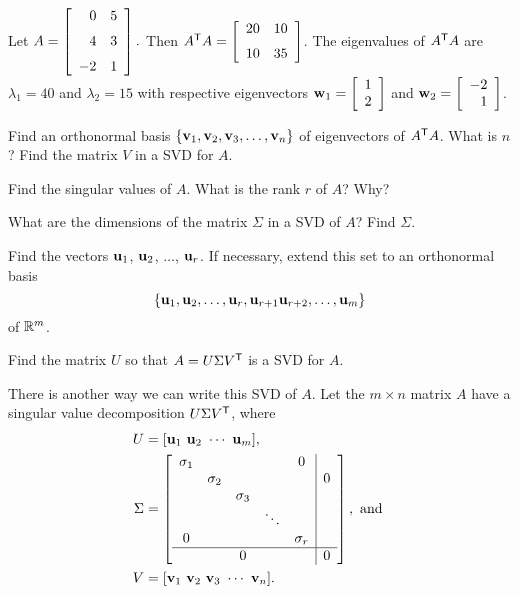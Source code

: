 \begin{activity} \label{ex:7_c_SVD} Let $A = \left[ \begin {array}{rc} 0&5\\ \noalign{\medskip}4&3
\\ \noalign{\medskip}-2&1\end {array} \right].$ Then $A^{\tr}A = \left[ \begin {array}{cc} 20&10\\ \noalign{\medskip}10&35\end {array}
 \right]$. The eigenvalues of $A^{\mathsf{T}}A$ are $\lambda_1 = 40$ and $\lambda_2 = 15$ with respective eigenvectors $\mathbf{w}_1 = \left[ \begin {array}{c} 1 \\ 2 \end {array} \right]$ and $\mathbf{w}_2 = \left[ \begin {array}{r} -2 \\ 1 \end {array} \right]$.
 	\ba
	\item Find an orthonormal basis $\{\mathbf{v}_1, \mathbf{v}_2, \mathbf{v}_3, \ldots, \mathbf{v}_n\}$ of eigenvectors of $A^{\mathsf{T}}A$. What is $n$? Find the matrix $V$ in a SVD for $A$.
		
	
	
	\item Find the singular values of $A$. What is the rank $r$ of $A$? Why?

	
	
	\item What are the dimensions of the matrix $\Sigma$ in a SVD of $A$? Find $\Sigma$.
	
	
	
	\item Find the vectors $\mathbf{u}_1$, $\mathbf{u}_2$, $\ldots$, $\mathbf{u}_r$. If necessary, extend this set to an orthonormal basis
\[\{\mathbf{u}_1, \mathbf{u}_2, \ldots, \mathbf{u}_r, \mathbf{u}_{r+1} \mathbf{u}_{r+2}, \ldots, \mathbf{u}_m\}\]
of $\mathbb{R}^m$. 
	
	
	
	\item Find the matrix $U$ so that $A = U \Sigma V^{\mathsf{T}}$ is a SVD for $A$.
	
	
	
	\ea
\end{activity}

There is another way we can write this SVD of $A$. Let the $m \times n$ matrix $A$ have a singular value decomposition $U \Sigma V^{\mathsf{T}}$, where
\begin{align*}
U &= [\mathbf{u}_1 \ \mathbf{u}_2 \ \cdots \ \mathbf{u}_m], \\
\Sigma &= \left[ \begin{array}{ccccc|c} \sigma_1&&&&0& \\ & \sigma_2&&&&0 \\ && \sigma_3&&& \\ &  & & \ddots & & \\ 0&&&& \sigma_r \\ \hline &&0&&&0 \end{array} \right],  \text{ and }  \\
V &= [\mathbf{v}_1 \ \mathbf{v}_2 \ \mathbf{v}_3 \   \cdots \  \mathbf{v}_n ].
\end{align*}

